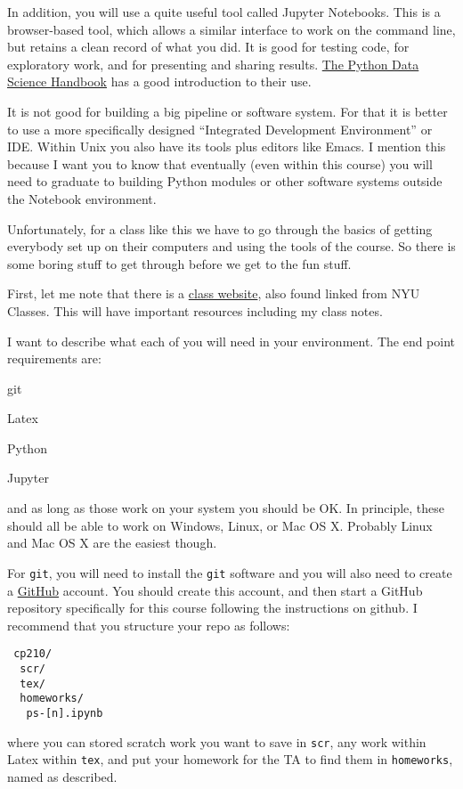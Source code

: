 In addition, you will use a quite useful tool called Jupyter
Notebooks. This is a browser-based tool, which allows a similar
interface to work on the command line, but retains a clean record of
what you did. It is good for testing code, for exploratory work, and
for presenting and sharing
results. \href{https://github.com/jakevdp/PythonDataScienceHandbook/tree/de0cc6bd317012d50ab3dd06e3cf4e256de1973f/notebooks}{The
  Python Data Science Handbook} has a good introduction to their use.

It is not good for building a big pipeline or software system. For
that it is better to use a more specifically designed ``Integrated
Development Environment'' or IDE. Within Unix you also have its tools
plus editors like Emacs. I mention this because I want you to know
that eventually (even within this course) you will need to graduate to
building Python modules or other software systems outside the Notebook
environment.

Unfortunately, for a class like this we have to go through the basics
of getting everybody set up on their computers and using the tools of
the course. So there is some boring stuff to get through before we get
to the fun stuff. 

First, let me note that there is a
\href{https://blanton144.github.io/computational/}{\color{red} class
  website}, also found linked from NYU Classes. This will have
important resources including my class notes.

I want to describe what each of you will need in your environment. The
end point requirements are:
\begin{ditemize}
\item git
\item Latex
\item Python
\item Jupyter
\end{ditemize}
and as long as those work on your system you should be OK. In
principle, these should all be able to work on Windows, Linux, or Mac
OS X. Probably Linux and Mac OS X are the easiest though.

For {\tt git}, you will need to install the {\tt git} software and you
will also need to create a \href{http://github.com}{\color{red}
  GitHub} account. You should create this account, and then start a
GitHub repository specifically for this course following the
instructions on github. I recommend that you structure your repo as
follows:
\begin{verbatim}
 cp210/
  scr/
  tex/ 
  homeworks/
   ps-[n].ipynb
\end{verbatim}
where you can stored scratch work you want to save in {\tt scr}, any
work within Latex within {\tt tex}, and put your homework for the TA
to find them in {\tt homeworks}, named as described. 


